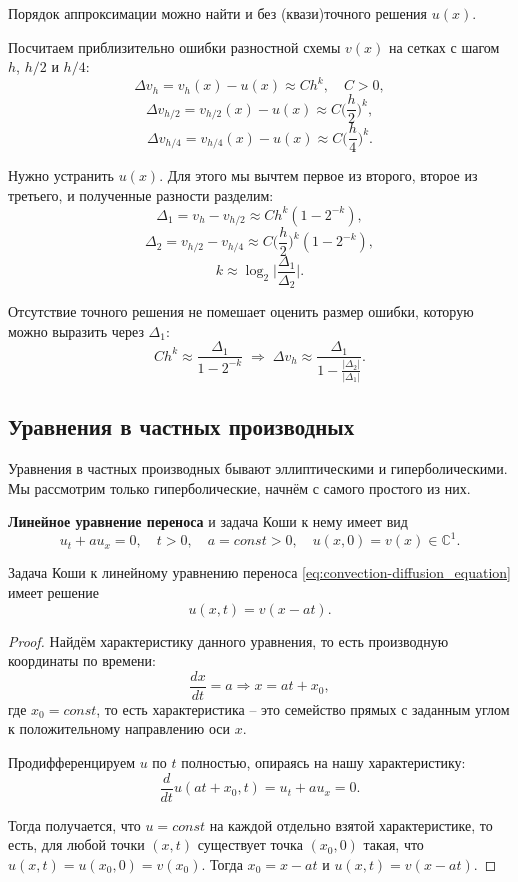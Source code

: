 \documentclass[../main.tex]{subfile}
\begin{document}
Порядок аппроксимации можно найти и без (квази)точного решения $u(x)$.

\begin{algorithm}
	Посчитаем приблизительно ошибки разностной схемы $v(x)$ на сетках с
	шагом $h$, $h/2$ и $h/4$:
	\[\Delta v_h=v_h(x)-u(x)\approx Ch^k,\quad C>0,\]
	\[\Delta v_{h/2}=v_{h/2}(x)-u(x)\approx C\Big(\frac{h}{2}\Big)^k,\]
	\[\Delta v_{h/4}=v_{h/4}(x)-u(x)\approx C\Big(\frac{h}{4}\Big)^k.\]

	Нужно устранить $u(x)$. Для этого мы вычтем первое из второго, второе
	из третьего, и полученные разности разделим:
	\[\Delta_1=v_h-v_{h/2}\approx Ch^k(1-2^{-k}),\]
	\[\Delta_2=v_{h/2}-v_{h/4}\approx C\Big(\frac{h}{2}\Big)^k(1-2^{-k}),\]
	\[\boxed{k\approx\log_2{\Big|\frac{\Delta_1}{\Delta_2}\Big|}}.\]

	Отсутствие точного решения не помешает оценить размер ошибки,
	которую можно выразить через $\Delta_1$:
	\[Ch^k\approx\frac{\Delta_1}{1-2^{-k}}\;\Rightarrow\; \boxed{\Delta v_h
	\approx\frac{\Delta_1}{1-\frac{|\Delta_2|}{|\Delta_1|}}}.\]
\end{algorithm}

\subsection{Уравнения в частных производных}
Уравнения в частных производных бывают эллиптическими и гиперболическими. Мы
рассмотрим только гиперболические, начнём с самого простого из них.

\begin{define}\label{eq:convection-diffusion_equation}
	\textbf{Линейное уравнение переноса} и задача Коши к нему имеет вид
	\[u_t+au_x=0,\quad t>0,\quad a=const>0,\quad u(x,0)=v(x)\in
	\mathbb C^1.\]
\end{define}

\begin{lemma}\label{eq:CDE_solution}
	Задача Коши к линейному уравнению переноса
	\eqref{eq:convection-diffusion_equation} имеет решение
	\[\boxed{u(x,t)=v(x-at)}.\]
\end{lemma}

\begin{proof}
	Найдём характеристику данного уравнения, то есть производную
	координаты по времени:
	\[\frac{dx}{dt}=a\Rightarrow x=at+x_0,\]
	где $x_0=const$, то есть характеристика -- это семейство прямых с
	заданным углом к положительному направлению оси $x$.

	Продифференцируем $u$ по $t$ полностью, опираясь на нашу характеристику:
	\[\frac{d}{dt}u(at+x_0,t)=u_t+au_x=0.\]

	Тогда получается, что $u=const$ на каждой отдельно взятой
	характеристике, то есть, для любой точки $(x,t)$ существует точка
	$(x_0,0)$ такая, что $u(x,t)=u(x_0,0)=v(x_0)$. Тогда $x_0=x-at$ и
	$u(x,t)=v(x-at)$.
\end{proof}
\end{document}
